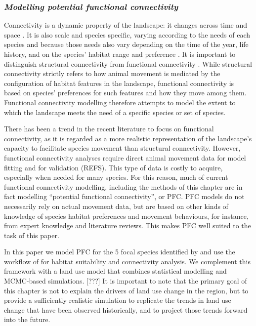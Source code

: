 \subsubsection*{\textit{Modelling potential functional connectivity}}
Connectivity is a dynamic property of the landscape: it changes across time and space \citep{beyer_functional_2013}. It is also scale and species specific, varying according to the needs of each species and because those needs also vary depending on the time of the year, life history, and on the species’ habitat range and preference \citep{anderson_scale-dependent_2005}. It is important to distinguish structural connectivity from functional connectivity \citep{kindlmann_connectivity_2008}. While structural connectivity strictly refers to how animal movement is mediated by the configuration of habitat features in the landscape, functional connectivity is based on species’ preferences for such features and how they move among them. Functional connectivity modelling therefore attempts to model the extent to which the landscape meets the need of a specific species or set of species.

There has been a trend in the recent literature to focus on functional connectivity, as it is regarded as a more realistic representation of  the landscape’s capacity to facilitate species movement than structural connectivity. However, functional connectivity analyses require direct animal movement data for model fitting and for validation (REFS). This type of data is costly to acquire, especially when needed for many species. For this reason, much of current functional connectivity modelling, including the methods of this chapter are in fact modelling “potential functional connectivity”, or PFC. PFC models do not necessarily rely on actual movement data, but are based on other kinds of knowledge of species habitat preferences and movement behaviours, for instance, from expert knowledge and literature reviews. This makes PFC well suited to the task of this paper. 

In this paper we model  PFC for the 5 focal species identified by  \cite{meurant_selecting_2018} and use the workflow of \citep{rayfield_priorisation_2018} for habitat suitability and connectivity analysis. We complement this framework with a land use model that combines statistical modelling and MCMC-based simulations. [???] It is important to note that the primary goal of this chapter is not to explain the drivers of land use change in the region, but to provide a sufficiently realistic simulation to replicate the trends in land use change that have been observed historically, and to project those trends forward into the future. \\

